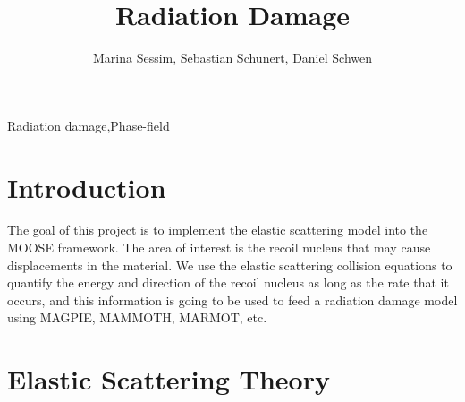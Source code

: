 \documentclass[review]{elsarticle}
\begin{document}
\begin{frontmatter}

\title{Radiation Damage}

\author{Marina Sessim, Sebastian Schunert, Daniel Schwen}
\address{Fuels Modeling and Simulation Department, Idaho National Laboratory, P.O Box 1625, Idaho Falls, ID 83415}




\begin{abstract}

\end{abstract}

\begin{keyword}
Radiation damage\sep Phase-field 
\end{keyword}

\end{frontmatter}

\linenumbers

\section{Introduction}

The goal of this project is to implement the elastic scattering model into the MOOSE framework. The area of interest is the recoil nucleus that may cause displacements in the material. We use the elastic scattering collision equations to quantify the energy and direction of the recoil nucleus as long as the rate that it occurs, and this information is going to be used to feed a radiation damage model using MAGPIE, MAMMOTH, MARMOT, etc.


\section{Elastic Scattering Theory}
\end{document}
